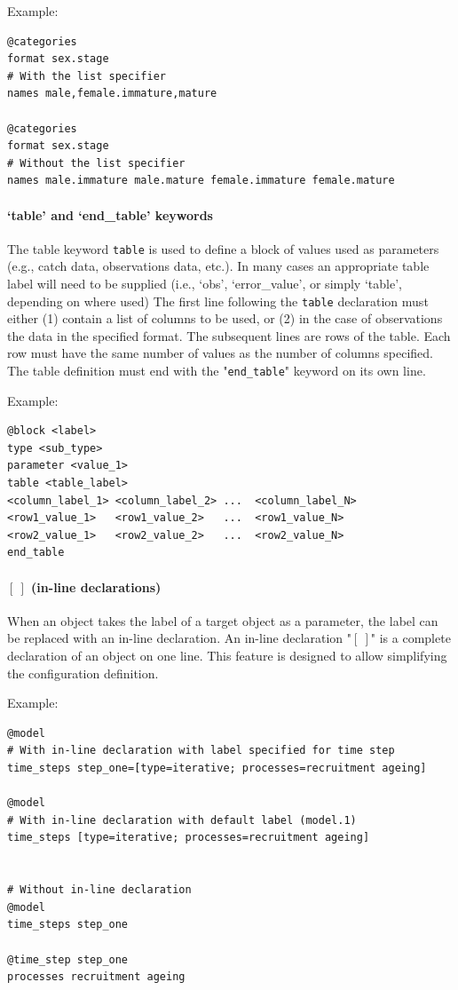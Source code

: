 Example:

{\small{\begin{verbatim}
@categories
format sex.stage
# With the list specifier
names male,female.immature,mature

@categories
format sex.stage
# Without the list specifier
names male.immature male.mature female.immature female.mature
\end{verbatim}}}

\paragraph*{`table' and `end\_table' keywords}\label{sec:DataTable}

The table keyword \texttt{table} is used to define a block of values used as parameters (e.g., catch data, observations data, etc.). In many cases an appropriate table label will need to be supplied (i.e., `obs', `error\_value', or simply `table', depending on where used) The first line following the \texttt{table} declaration must either (1) contain a list of columns to be used, or (2) in the case of observations the data in the specified format. The subsequent lines are rows of the table. Each row must have the same number of values as the number of columns specified. The table definition must end with the "\texttt{end\_table}" keyword on its own line.

Example:

{\small{\begin{verbatim}
@block <label>
type <sub_type>
parameter <value_1>
table <table_label>
<column_label_1> <column_label_2> ...  <column_label_N>
<row1_value_1>   <row1_value_2>   ...  <row1_value_N>
<row2_value_1>   <row2_value_2>   ...  <row2_value_N>
end_table
\end{verbatim}}}

\paragraph*{$[\ ]$ (in-line declarations)}

When an object takes the label of a target object as a parameter, the label can be replaced with an in-line declaration. An in-line declaration "\texttt{$[\ ]$}" is a complete declaration of an object on one line. This feature is designed to allow simplifying the configuration definition.

Example:

{\small{\begin{verbatim}
@model
# With in-line declaration with label specified for time step
time_steps step_one=[type=iterative; processes=recruitment ageing]

@model
# With in-line declaration with default label (model.1)
time_steps [type=iterative; processes=recruitment ageing]


# Without in-line declaration
@model
time_steps step_one

@time_step step_one
processes recruitment ageing
\end{verbatim}}}


